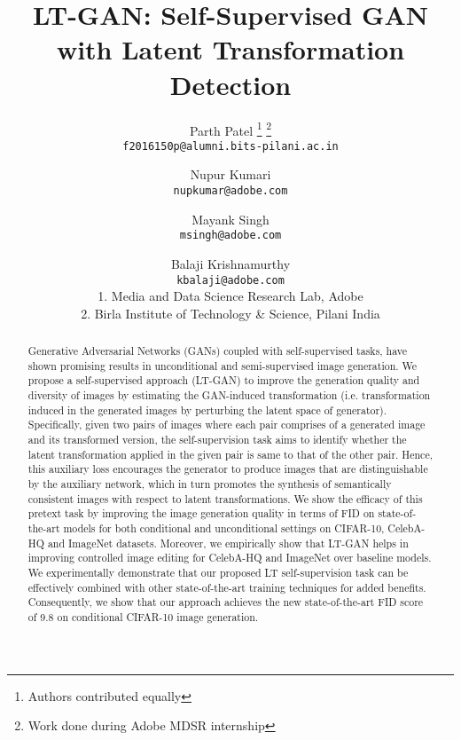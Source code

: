 \documentclass[10pt,twocolumn,letterpaper]{article}
\begin{document}
\title{LT-GAN: Self-Supervised GAN with Latent Transformation Detection}
\author{Parth Patel \thanks{Authors contributed equally}  \thanks{Work done during Adobe MDSR internship}   \\
{\tt\small f2016150p@alumni.bits-pilani.ac.in}
\and
Nupur Kumari \\
{\tt\small nupkumar@adobe.com}
\and
Mayank Singh \\
{\tt\small msingh@adobe.com}
\and
Balaji Krishnamurthy \\
{\tt\small kbalaji@adobe.com} \\
1. Media and Data Science Research Lab, Adobe \\
2. Birla Institute of Technology \& Science, Pilani India 
}
\maketitle
\ifwacvfinal\thispagestyle{empty}\fi

\maketitle


\begin{abstract}
Generative Adversarial Networks (GANs) coupled with self-supervised tasks, have shown promising results in unconditional and semi-supervised image generation. We propose a self-supervised approach (LT-GAN) to improve the generation quality and diversity of images by estimating the GAN-induced transformation (i.e. transformation induced in the generated images by perturbing the latent space of generator). Specifically, given two pairs of images where each pair comprises of a generated image and its transformed version, the self-supervision task aims to identify whether the latent transformation applied in the given pair is same to that of the other pair. Hence, this auxiliary loss encourages the generator to produce images that are distinguishable by the auxiliary network, which in turn promotes the synthesis of semantically consistent images with respect to latent transformations. We show the efficacy of this pretext task by improving the image generation quality in terms of FID on state-of-the-art models for both conditional and unconditional settings on CIFAR-10, CelebA-HQ and ImageNet datasets. Moreover, we empirically show that LT-GAN helps in improving controlled image editing for CelebA-HQ and ImageNet over baseline models. We experimentally demonstrate that our proposed LT self-supervision task can be effectively combined with other state-of-the-art training techniques for added benefits. Consequently, we show that our approach achieves the new state-of-the-art FID score of 9.8 on conditional CIFAR-10 image generation.






\end{abstract}
\end{document}
